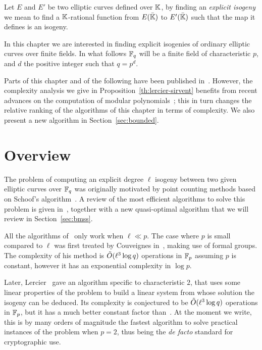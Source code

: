

Let $E$ and $E'$ be two elliptic curves defined over $\mathbb{K}$, by finding
an \emph{explicit isogeny} we mean to find a $\mathbb{K}$-rational function
from $E(\bar{\mathbb{K}})$ to $E'(\bar{\mathbb{K}})$ such that the map it defines is
an isogeny.

In this chapter we are interested in finding explicit isogenies of
ordinary elliptic curves over finite fields. In what follows $\mathbb{F}_q$
will be a finite field of characteristic $p$, and $d$ the positive
integer such that $q=p^d$.

Parts of this chapter and of the following have been published
in~\cite{df10}. However, the complexity analysis we give in
Proposition~\ref{th:lercier-sirvent} benefits from recent advances on
the computation of modular polynomials~\cite{sutherland10:modpol};
this in turn changes the relative ranking of the algorithms of this
chapter in terms of complexity. We also present a new algorithm in
Section~\ref{sec:bounded}.


\section{Overview}
\label{sec:history}

The problem of computing an explicit degree $\ell$ isogeny between two
given elliptic curves over $\mathbb{F}_q$ was originally motivated by point
counting methods based on Schoof's
algorithm~\cite{atkin88,elkies98,schoof95}. A review of the most
efficient algorithms to solve this problem is given
in~\cite{bostan+morain+salvy+schost08}, together with a new
quasi-optimal algorithm that we will review in Section~\ref{sec:bmss}.

All the algorithms of~\cite{bostan+morain+salvy+schost08} only work
when $\ell\ll p$. The case where $p$ is small compared to $\ell$ was
first treated by Couveignes in~\cite{couveignes94}, making use of
formal groups. The complexity of his method is $\tilde{O}(\ell^3\log q)$ operations in
$\mathbb{F}_p$ assuming $p$ is constant, however it has an exponential
complexity in $\log p$.

Later, Lercier~\cite{lercier96} gave an algorithm specific to
characteristic $2$, that uses some linear properties of the problem to
build a linear system from whose solution the isogeny can be deduced.
Its complexity is conjectured to be $\tilde{O}(\ell^3\log q)$ operations
in $\mathbb{F}_p$, but it has a much better constant factor
than~\cite{couveignes94}. At the moment we write, this is by many
orders of magnitude the fastest algorithm to solve practical instances
of the problem when $p=2$, thus being the \emph{de facto} standard for
cryptographic use.

